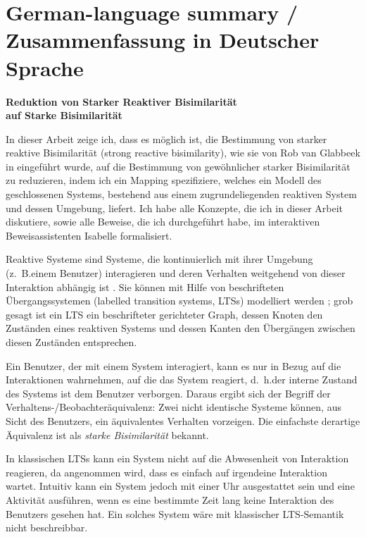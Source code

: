\chapter*{German-language summary / Zusammenfassung in Deutscher Sprache}
\thispagestyle{empty}

\textbf{Reduktion von Starker Reaktiver Bisimilarität\\auf Starke Bisimilarität}

In dieser Arbeit zeige ich, dass es möglich ist, die Bestimmung von starker reaktive Bisimilarität (strong reactive bisimilarity), wie sie von Rob van Glabbeek in \cite{rbs} eingeführt wurde, auf die Bestimmung von gewöhnlicher starker Bisimilarität zu reduzieren, indem ich ein Mapping spezifiziere, welches ein Modell des geschlossenen Systems, bestehend aus einem zugrundeliegenden reaktiven System und dessen Umgebung, liefert. Ich habe alle Kon\-zepte, die ich in dieser Arbeit diskutiere, sowie alle Beweise, die ich durchgeführt habe, im interaktiven Beweisassistenten Isabelle formalisiert.

Reaktive Systeme sind Systeme, die kontinuierlich mit ihrer Umgebung (z.\@~B.\@ einem Benutzer) interagieren und deren Verhalten weitgehend von dieser Interaktion abhängig ist \cite{harel85}.
Sie können mit Hilfe von beschrifteten Übergangssystemen (labelled transition systems, LTSs) modelliert werden \cite{keller76}; grob gesagt ist ein LTS ein beschrifteter gerichteter Graph, dessen Knoten den Zuständen eines reaktiven Systems und dessen Kanten den Übergängen zwischen diesen Zuständen entsprechen.

Ein Benutzer, der mit einem System interagiert, kann es nur in Bezug auf die Interaktionen wahrnehmen, auf die das System reagiert, d.\@~h.\@ der interne Zustand des Systems ist dem Benutzer verborgen. Daraus ergibt sich der Begriff der Verhaltens-/Beobachteräquivalenz: Zwei nicht identische Systeme können, aus Sicht des Benutzers, ein äquivalentes Verhalten vorzeigen. Die einfachste derartige Äquivalenz ist als \emph{starke Bisimilarität} bekannt.

In klassischen LTSs kann ein System nicht auf die Abwesenheit von Interaktion reagieren, da angenommen wird, dass es einfach auf irgendeine Interaktion wartet. Intuitiv kann ein System jedoch mit einer Uhr ausgestattet sein und eine Aktivität ausführen, wenn es eine bestimmte Zeit lang keine Interaktion des Benutzers gesehen hat. Ein solches System wäre mit klassischer LTS-Semantik nicht beschreibbar.

